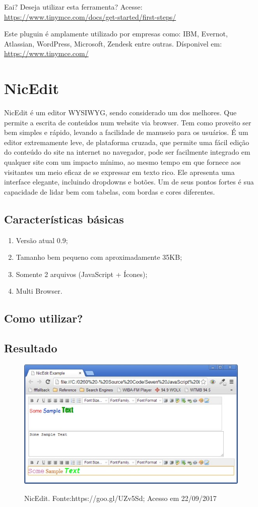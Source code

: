 \documentclass[12pt,a4paper]{article}
\begin{document}
Eai? Deseja utilizar esta ferramenta?
Acesse: \url{ https://www.tinymce.com/docs/get-started/first-steps/}

Este pluguin é amplamente utilizado  por empresas como: IBM, Evernot, Atlassian, WordPress, Microsoft, Zendesk entre outras. Dísponivel em: \url{https://www.tinymce.com/}


\section{NicEdit}
NicEdit é um editor WYSIWYG, sendo considerado um dos melhores. Que permite a escrita de conteúdos num website via browser. Tem como proveito ser bem simples e rápido, levando a facilidade de manuseio para os usuários. 
É um editor extremamente leve, de plataforma cruzada, que permite uma fácil edição do conteúdo do site na internet no navegador, pode ser facilmente integrado em qualquer site com um impacto mínimo, ao mesmo tempo em que fornece aos visitantes um meio eficaz de se expressar em texto rico.
Ele apresenta uma interface elegante, incluindo dropdowns e botões. Um de seus pontos fortes é sua capacidade de lidar bem com tabelas, com bordas e cores diferentes.

\subsection{Características básicas}
\begin{enumerate}
\item Versão atual 0.9;
\item Tamanho bem pequeno com aproximadamente 35KB;
\item Somente 2 arquivos (JavaScript + Ícones);
\item Multi Browser.
\end{enumerate}

\subsection{Como utilizar?}


\subsection{Resultado}
\begin{figure}[h]
\centering
\includegraphics[width=13cm]{recursos/NicEdit/NicEdit.jpg}
\label{2}
\caption{NicEdit. Fonte:https://goo.gl/UZv5Sd; Acesso em 22/09/2017}
\end{figure}
\end{document}
